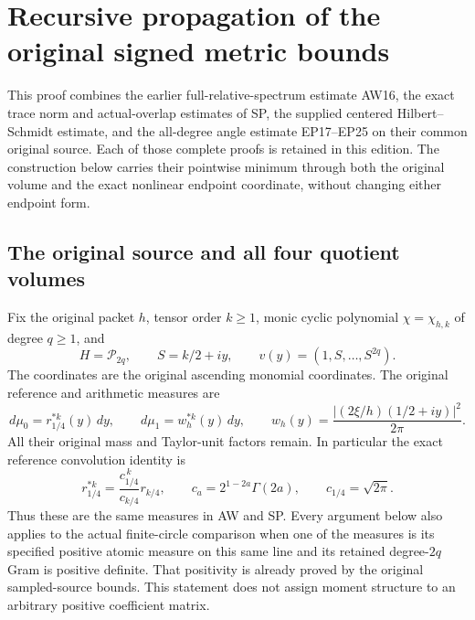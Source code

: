 \section{Recursive propagation of the original signed metric bounds}
\label{GraphV2:sec:recursive-metric-transport}

This proof combines the earlier full-relative-spectrum estimate AW16,
the exact trace norm and actual-overlap estimates of SP, the supplied
centered Hilbert--Schmidt estimate, and the all-degree angle estimate
EP17--EP25 on their common original source.  Each of those complete
proofs is retained in this edition.  The construction below carries
their pointwise minimum through both the original volume and the exact
nonlinear endpoint coordinate, without changing either endpoint form.

\subsection{The original source and all four quotient volumes}

Fix the original packet \(h\), tensor order \(k\geq1\), monic cyclic
polynomial \(\chi=\chi_{h,k}\) of degree \(q\geq1\), and
\[
 H=\mathcal P_{2q},\qquad S=k/2+iy,\qquad
 v(y)=(1,S,\ldots,S^{2q}).
 \tag{RMT1}
\]
The coordinates are the original ascending monomial coordinates.
The original reference and arithmetic measures are
\[
 d\mu_0=r_{1/4}^{*k}(y)\,dy,\qquad
 d\mu_1=w_h^{*k}(y)\,dy,\qquad
 w_h(y)=\frac{|(2\xi/h)(1/2+iy)|^2}{2\pi}.
 \tag{RMT2}
\]
All their original mass and Taylor-unit factors remain.  In particular
the exact reference convolution identity is
\[
 r_{1/4}^{*k}
 =\frac{c_{1/4}^{\,k}}{c_{k/4}}r_{k/4},\qquad
 c_a=2^{1-2a}\Gamma(2a),\qquad c_{1/4}=\sqrt{2\pi}.
 \tag{RMT3}
\]
Thus these are the same measures in AW and SP.  Every argument below
also applies to the actual finite-circle comparison when one of the
measures is its specified positive atomic measure on this same line
and its retained degree-\(2q\) Gram is positive definite.  That
positivity is already proved by the original sampled-source bounds.
This statement does not assign moment structure to an arbitrary
positive coefficient matrix.

